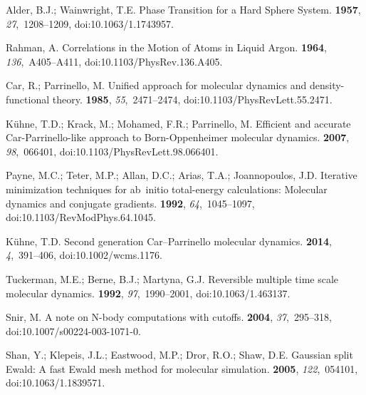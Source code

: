 \documentclass[computation,article,accept,moreauthors,pdftex]{Definitions/mdpi}
\begin{document}
\begin{thebibliography}{999}

Alder, B.J.; Wainwright, T.E.
\newblock Phase Transition for a Hard Sphere System.
 {\bf 1957}, {\em 27},~1208--1209, doi:10.1063/1.1743957.

Rahman, A.
\newblock Correlations in the Motion of Atoms in Liquid Argon.
 {\bf 1964}, {\em 136},~A405--A411, doi:10.1103/PhysRev.136.A405.

Car, R.; Parrinello, M.
\newblock Unified approach for molecular dynamics and density-functional
 theory.
 {\bf 1985}, {\em 55},~2471--2474, doi:10.1103/PhysRevLett.55.2471.

K\"uhne, T.D.; Krack, M.; Mohamed, F.R.; Parrinello, M.
\newblock Efficient and accurate Car-Parrinello-like approach to
 Born-Oppenheimer molecular dynamics.
 {\bf 2007}, {\em 98},~066401, doi:10.1103/PhysRevLett.98.066401.

Payne, M.C.; Teter, M.P.; Allan, D.C.; Arias, T.A.; Joannopoulos, J.D.
\newblock Iterative minimization techniques for ab~initio total-energy
 calculations: Molecular dynamics and conjugate gradients.
 {\bf 1992}, {\em 64},~1045--1097, doi:10.1103/RevModPhys.64.1045.

K\"uhne, T.D.
\newblock Second generation Car–Parrinello molecular dynamics.
 {\bf 2014}, {\em 4},~391--406, doi:10.1002/wcms.1176.

Tuckerman, M.E.; Berne, B.J.; Martyna, G.J.
\newblock Reversible multiple time scale molecular dynamics.
 {\bf 1992}, {\em 97},~1990--2001, doi:10.1063/1.463137.

Snir, M.
\newblock A note on N-body computations with cutoffs.
 {\bf 2004}, {\em 37},~295--318, doi:10.1007/s00224-003-1071-0.

Shan, Y.; Klepeis, J.L.; Eastwood, M.P.; Dror, R.O.; Shaw, D.E.
\newblock Gaussian split Ewald: A fast Ewald mesh method for molecular
 simulation.
 {\bf 2005}, {\em 122},~054101, doi:10.1063/1.1839571.


\end{thebibliography}
\end{document}
